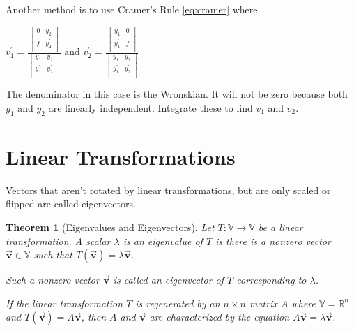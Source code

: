 \documentclass[12pt,landscape,twocolumn]{article}
\let\oldvec\vec
\renewcommand{\vec}[1]{\oldvec{\mathbf{ #1 } } }                    %
\newtheorem{thm}{Theorem}
\begin{document}
    Another method is to use Cramer's Rule \eqref{eq:cramer} where

        $
            v_1^\prime = \frac{\left[ \begin{matrix}
                0 & y_2\\
                f & y_2^\prime\\
            \end{matrix} \right]}{\left[ \begin{matrix}
                y_1 & y_2\\
                y_1^\prime & y_2^\prime\\
            \end{matrix} \right]}
            \text{ and }
            v_2^\prime = \frac{\left[ \begin{matrix}
                y_1 & 0\\
                y_1^\prime & f\\
            \end{matrix} \right]}{\left[ \begin{matrix}
                y_1 & y_2\\
                y_1^\prime & y_2^\prime\\
            \end{matrix} \right]}
        $

    The denominator in this case is the Wronskian. It will not be zero because both $y_1$ and $y_2$ are linearly independent. Integrate these to find $v_1$ and $v_2$.

\section{Linear Transformations}
Vectors that aren't rotated by linear transformations, but are only scaled or flipped are called eigenvectors.

\begin{thm}[Eigenvalues and Eigenvectors]
    Let $T: \mathbb{V} \to \mathbb{V}$ be a linear transformation. A scalar $\lambda$ is an eigenvalue of $T$ is there is a nonzero vector $\vec{v} \in \mathbb{V}$ such that $T(\vec{v}) = \lambda \vec{v}$.

    Such a nonzero vector $\vec{v}$ is called an eigenvector of $T$ corresponding to $\lambda$.

    If the linear transformation $T$ is regenerated by an $n\times n$ matrix $A$ where $\mathbb{V} = \mathbb{R}^n$ and $T(\vec{v}) = A \vec{v}$, then $A$ and $\vec{v}$ are characterized by the equation $A \vec{v} = \lambda \vec{v}$.
\end{thm}
\end{document}
